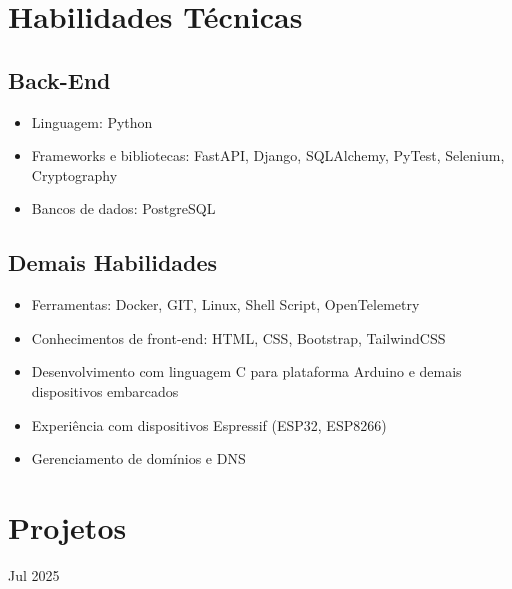 \documentclass{cv}
\begin{document}
\pagestyle{empty}

\maketitle

\section{Habilidades Técnicas}

\subsection{Back-End}

\begin{itemize}
  \item Linguagem: Python
  \item Frameworks e bibliotecas: FastAPI, Django, SQLAlchemy,
    PyTest, Selenium, Cryptography
  \item Bancos de dados: PostgreSQL
\end{itemize}

\subsection{Demais Habilidades}

\begin{itemize}
  \item Ferramentas: Docker, GIT, Linux, Shell Script, OpenTelemetry
  \item Conhecimentos de front-end: HTML, CSS, Bootstrap, TailwindCSS
  \item Desenvolvimento com linguagem C para plataforma Arduino e demais dispositivos embarcados
  \item Experiência com dispositivos Espressif (ESP32, ESP8266)
  \item Gerenciamento de domínios e DNS
\end{itemize}

\section{Projetos}

\hfill{Jul 2025}\\
\\
\vspace{0.15cm}
\end{document}
